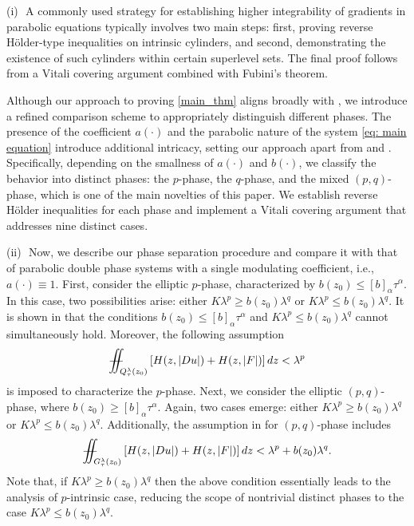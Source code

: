 \documentclass[11pt,oneside, english,reqno,twoside a4paper]{amsart}
\theoremstyle{definition}
\numberwithin{theorem}{section}
\numberwithin{equation}{section}
\newcommand{\iintss}{{\int\hspace{-0.28cm}\int}}
\newcommand{ \miints }{{\iintss\hspace{-0.56cm} -\hspace{-0.15cm}-}}
\newcommand{\miint}[1]{{\miints_{\hspace{-0.13cm}#1}}}
\begin{document}
\smallskip
(i)\,\, A commonly used strategy for establishing higher integrability of gradients in parabolic equations typically involves two main steps: first, proving reverse H\"{o}lder-type inequalities on intrinsic cylinders, and second, demonstrating the existence of such cylinders within certain superlevel sets. The final proof follows from a Vitali covering argument combined with Fubini's theorem.

Although our approach to proving \cref{main_thm} aligns broadly with \cite{2023_Gradient_Higher_Integrability_for_Degenerate_Parabolic_Double-Phase_Systems}, we introduce a refined comparison scheme to appropriately distinguish different phases. The presence of the coefficient $a(\cdot)$ and the parabolic nature of the system \eqref{eq: main equation} introduce additional intricacy, setting our approach apart from \cite{2023_Gradient_Higher_Integrability_for_Degenerate_Parabolic_Double-Phase_Systems} and \cite{KO24}. Specifically, depending on the smallness of $a(\cdot)$ and $b(\cdot)$, we classify the behavior into distinct phases: the $p$-phase, the $q$-phase, and the mixed $(p, q)$-phase, which is one of the main novelties of this paper.
We establish reverse H\"{o}lder inequalities for each phase and implement a Vitali covering argument that addresses nine distinct cases.

\smallskip
(ii)\,\, Now, we describe our phase separation procedure and compare it with that of parabolic double phase systems with a single modulating coefficient, i.e., $a(\cdot)\equiv 1$. First, consider the elliptic $p$-phase, characterized by $b(z_0)\leq [b]_{\alpha}\tau^{\alpha}.$ In this case, two possibilities arise: either $K\lambda^p\geq b(z_0)\lambda^q$ or $K\lambda^p\leq b(z_0)\lambda^q.$ It is shown in \cite{2023_Gradient_Higher_Integrability_for_Degenerate_Parabolic_Double-Phase_Systems} that the conditions $b(z_0)\leq [b]_{\alpha}\tau^{\alpha}$ and $K\lambda^p\leq b(z_0)\lambda^q$ cannot simultaneously hold. Moreover, the following assumption
\begin{align*}
\miint{Q^{\lambda}_{\tau}(z_0)} \left[ H(z, |Du|)+H(z, |F|)\right] dz<\lambda^p
\end{align*}
is imposed to characterize the $p$-phase.
Next, we consider the elliptic $(p, q)$-phase, where $b(z_0)\geq [b]_{\alpha}\tau^{\alpha}.$ Again, two cases emerge: either $K\lambda^p\geq b(z_0)\lambda^q$ or $K\lambda^p\leq b(z_0)\lambda^q.$ Additionally, the assumption in \cite{2023_Gradient_Higher_Integrability_for_Degenerate_Parabolic_Double-Phase_Systems} for $(p, q)$-phase includes
\begin{align*}
    \miint{G^{\lambda}_{\tau}(z_0)} \left[ H(z, |Du|)+H(z, |F|)\right] dz<\lambda^p+b(z_0)\lambda^q.
\end{align*}
Note that, if $K\lambda^p\geq b(z_0)\lambda^q$ then the above condition essentially leads to the analysis of $p$-intrinsic case, reducing the scope of nontrivial distinct phases to the case $K\lambda^p\leq b(z_0)\lambda^q.$
\end{document}
